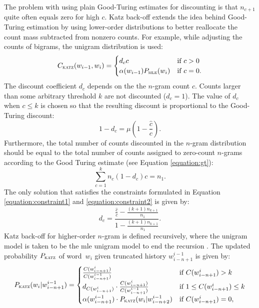 	The problem with using plain Good-Turing estimates for discounting is that $n_{c+1}$ quite often equals zero for high $c$. Katz back-off extends the idea behind Good-Turing estimation by using lower-order distributions to better reallocate the count mass subtracted from nonzero counts. For example, while adjusting the counts of bigrams, the unigram distribution is used: 
	\begin{equation}
		C_{\textsc{katz}}(w_{i-1}, w_{i})=
		\begin{cases}
			d_{c}c & \text{if } c>0 \\
			\alpha(w_{i-1})P_{\textsc{mle}}(w_{i}) & \text{if } c=0.
		\end{cases}
	\end{equation}
	The discount coefficient $d_{c}$ depends on the the \mbox{$n$-gram} count $c$. Counts larger than some arbitrary threshold $k$ are not discounted ($d_{c}=1$). The value of $d_{c}$ when $c\leq k$ is chosen so that the resulting discount is proportional to the Good-Turing discount: 
	\begin{equation}
		1-d_{c}=\mu(1-\frac{\hat{c}}{c}).
		\label{equation:constraint1}
	\end{equation}
	Furthermore, the total number of counts discounted in the \mbox{$n$-gram} distribution should be equal to the total number of counts assigned to zero-count \mbox{$n$-grams} according to the Good Turing estimate (see Equation \ref{equation:gt}):
	\begin{equation}
		\sum_{c=1}^{k}n_{c}(1-d_{c})c=n_{1}.
		\label{equation:constraint2}
	\end{equation}
	The only solution that satisfies the constraints formulated in Equation \ref{equation:constraint1} and \ref{equation:constraint2} is given by:
	\begin{equation}
		d_{c}=\frac{\frac{\hat{c}}{c}-\frac{(k+1)n_{k+1}}{n_{1}}}{1-\frac{(k+1)n_{k+1}}{n_{1}}}.
		\label{equation:dc}
	\end{equation}
	Katz back-off for higher-order \mbox{$n$-gram} is defined recursively, where the unigram model is taken to be the \gls{mle} unigram model to end the recursion \cite{whittaker2000statistical}. The updated probability $P_{\textsc{katz}}$ of word~$w_{i}$ given truncated history $w_{i-n+1}^{i-1}$ is given by:
        \begin{equation}
        P_{\textsc{katz}}(w_{i}|w_{i-n+1}^{i-1})=
        \begin{cases}
           \frac{C(w_{i-n+1}^{i})}{C(w_{i-n+1}^{i-1})}& \text{if }C(w_{i-n+1}^{i}) > k\\
           d_{C(w_{i-n+1}^{i})}\cdot \frac{C(w_{i-n+1}^{i})}{C(w_{i-n+1}^{i-1})}& \text{if } 1\leq C(w_{i-n+1}^{i})\leq k\\
           \alpha(w_{i-n+1}^{i-1})\cdot P_{\textsc{katz}}(w_{i}|w_{i-n+2}^{i-1})& \text{if } C(w_{i-n+1}^{i})=0,
        \end{cases}
        \end{equation}
